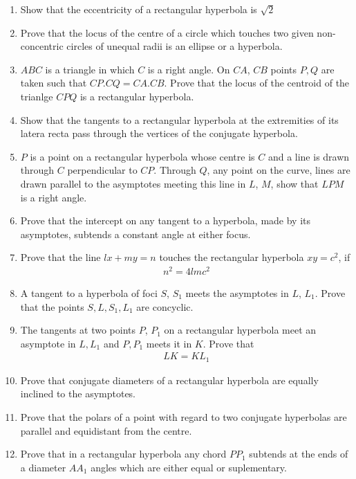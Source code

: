 \renewcommand{\theequation}{\theenumi}
\begin{enumerate}[label=\arabic*.,ref=\thesubsection.\theenumi]
\item Show that the eccentricity of a rectangular hyperbola is $\sqrt{2}$
\item Prove that the locus of the centre of a circle which touches two
given non-concentric circles of unequal radii is an ellipse or a hyperbola.
\item $ABC$ is a triangle in which $C$ is a right angle.  On $CA$, $CB$ points $P, Q$ are
taken such that $CP.CQ=CA.CB$.  Prove that the locus of the centroid of the trianlge $CPQ$ is a rectangular hyperbola.
\item Show that the tangents to a rectangular hyperbola at the extremities of its latera
recta pass through the vertices of the conjugate hyperbola.
\item $P$ is a point on a rectangular hyperbola whose centre is $C$ and a 
line is drawn through $C$ perpendicular to $CP$.  Through
$Q$, any point on the curve, lines are drawn parallel to the asymptotes meeting
this line in $L$, $M$, show that $LPM$ is a right angle.
\item Prove that the intercept on any tangent to a hyperbola, made by its asymptotes, subtends a constant
angle at either focus.
\item Prove that the line $lx+my=n$ touches the rectangular hyperbola $xy=c^2$, if
\begin{align*}
n^2 = 4lmc^2
\end{align*}
\item A tangent to a hyperbola of foci $S$, $S_1$ meets the asymptotes
in $L$, $L_1$.  Prove that the points $S, L, S_1, L_1$ are concyclic.
\item The tangents at two points $P$, $P_1$ on a rectangular hyperbola meet an asymptote in $L, L_1$ and
$P,P_1$ meets it in $K$.  Prove that
\begin{align*}
LK = KL_1
\end{align*}
\item Prove that conjugate diameters of a rectangular hyperbola are equally inclined to the asymptotes.
\item Prove that the polars of a point with regard to two conjugate hyperbolas are parallel and equidistant from the
centre.
\item Prove that in a rectangular hyperbola any chord $PP_1$ subtends at the ends of a diameter $AA_1$ 
angles which are either equal or suplementary.

\end{enumerate}
